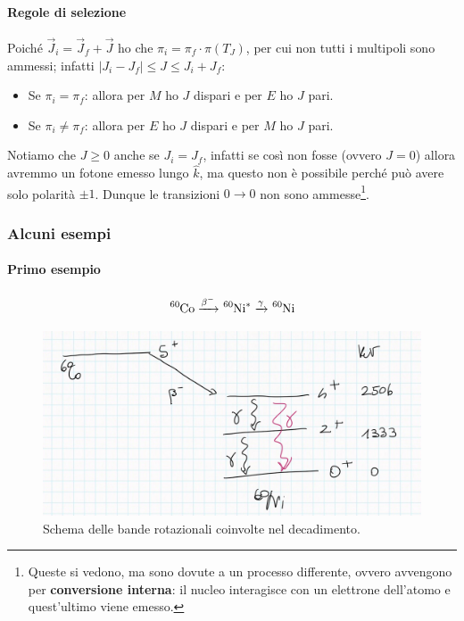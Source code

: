 \paragraph{Regole di selezione} Poiché $\vec{J}_i = \vec{J}_f + \vec{J}$ ho che $\pi_i = \pi_f \cdot \pi(T_J)$, per cui non tutti i multipoli sono ammessi; infatti $|J_i - J_f|\leq J\leq J_i+J_f$:
\begin{itemize}
    \item Se $\pi_i = \pi_f$: allora per $M$ ho $J$ dispari e per $E$ ho $J$ pari.
    \item Se $\pi_i \not = \pi_f$: allora per $E$ ho $J$ dispari e per $M$ ho $J$ pari.
\end{itemize}
Notiamo che $J\geq 0$ anche se $J_i=J_f$, infatti se così non fosse (ovvero $J=0$) allora avremmo un fotone emesso lungo $\hat{k}$, ma questo non è possibile perché può avere solo polarità $\pm 1$. Dunque le transizioni $0\to 0$ non sono ammesse\footnote{Queste si vedono, ma sono dovute a un processo differente, ovvero avvengono per \textbf{conversione interna}: il nucleo interagisce con un elettrone dell'atomo e quest'ultimo viene emesso.}.

\subsubsection{Alcuni esempi}
\paragraph{Primo esempio}
$$\ce{^{60}Co}  \xrightarrow{\beta^-} \ce{^{60}Ni}^*  \xrightarrow{\gamma}  \ce{^{60}Ni}$$

\begin{figure}[h]
    \centering
    \includegraphics[scale=0.2]{Immagini/0310_bande.png}
    \caption{Schema delle bande rotazionali coinvolte nel decadimento.}
    \label{0310_bande}
\end{figure}

